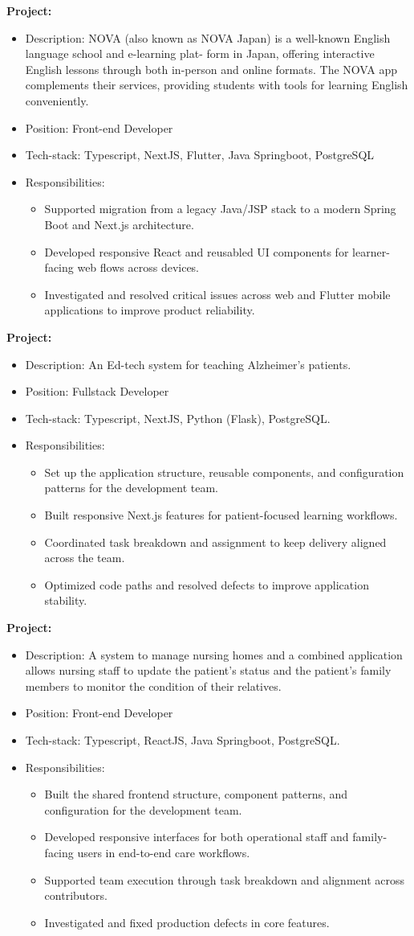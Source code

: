 \documentclass[a4paper, 11pt]{article}
\newcommand{\projectHeading}[1]{%
\textbf{Project:} \text{#1}%
\vspace{-3.0mm}%
}
\newcommand{\responsibilities}{%
\item{Responsibilities:}%
\begin{itemize}[leftmargin=6ex,noitemsep,labelsep=1mm,itemsep=0mm,label={·}]\small%
}
\newcommand{\responsibilitiesEnd}{\end{itemize}}
\newcommand{\resumeItemListStart}{\begin{justify}\begin{itemize}[leftmargin=3ex,
rightmargin=2ex, noitemsep,labelsep=1.2mm,itemsep=0mm]\small}
\newcommand{\resumeItemListEnd}{\end{itemize}\end{justify}
\vspace{-2mm}}
\begin{document}
\projectHeading{NOVA}
\resumeItemListStart
\item {Description: NOVA (also known as NOVA Japan) is a well-known English language school and e-learning plat-
            form in Japan, offering interactive English lessons through both in-person and online formats. The NOVA app
            complements their services, providing students with tools for learning English conveniently.}
\item {Position: Front-end Developer}
\item {Tech-stack: Typescript, NextJS, Flutter, Java Springboot, PostgreSQL}
\responsibilities
\item {Supported migration from a legacy Java/JSP stack to a modern Spring Boot and Next.js architecture.}
\item {Developed responsive React and reusabled UI components for learner-facing web flows across devices.}
\item {Investigated and resolved critical issues across web and Flutter mobile applications to improve product reliability.}
\responsibilitiesEnd
\resumeItemListEnd
\projectHeading{MTB}
\resumeItemListStart
\item {Description: An Ed-tech system for teaching Alzheimer's patients.}
\item {Position: Fullstack Developer}
\item {Tech-stack: Typescript, NextJS, Python (Flask), PostgreSQL.}
\responsibilities
\item {Set up the application structure, reusable components, and configuration patterns for the development team.}
\item {Built responsive Next.js features for patient-focused learning workflows.}
\item {Coordinated task breakdown and assignment to keep delivery aligned across the team.}
\item {Optimized code paths and resolved defects to improve application stability.}
\responsibilitiesEnd
\resumeItemListEnd

\projectHeading{Nursingcare}
\resumeItemListStart
\item {Description: A system to manage nursing homes and a combined application
            allows nursing staff to update the patient's status and the patient's family
            members to monitor the condition of their relatives.}
\item {Position: Front-end Developer}
\item {Tech-stack: Typescript, ReactJS, Java Springboot, PostgreSQL.}
\responsibilities
\item {Built the shared frontend structure, component patterns, and configuration for the development team.}
\item {Developed responsive interfaces for both operational staff and family-facing users in end-to-end care workflows.}
\item {Supported team execution through task breakdown and alignment across contributors.}
\item {Investigated and fixed production defects in core features.}
\responsibilitiesEnd
\resumeItemListEnd
\end{document}
